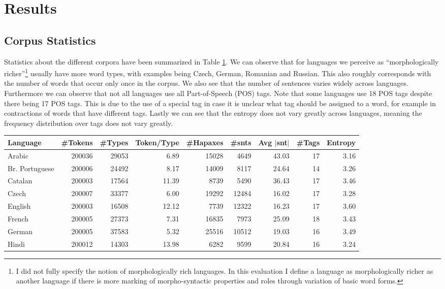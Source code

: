\documentclass[11pt]{article}
\begin{document}
{\section{Results}\label{res}
\subsection{Corpus Statistics}
Statistics about the different corpora have been summarized in Table \ref{stats}. We can observe that for languages we perceive as ``morphologically richer''\footnote{I did not fully specify the notion of morphologically rich languages. In this evaluation I define a language as morphologically richer as another language if there is more marking of morpho-syntactic properties and roles through variation of basic word forms.} usually have more word types, with examples being Czech, German, Romanian and Russian. This also roughly corresponds with the number of words that occur only once in the corpus. We also see that the number of sentences varies widely across languages. Furthermore we can observe that not all languages use all Part-of-Speech (POS) tags. Note that some languages use 18 POS tags despite there being 17 POS tags. This is due to the use of a special tag in case it is unclear what tag should be assigned to a word, for example in contractions of words that have different tags. Lastly we can see that the entropy does not vary greatly across languages, meaning the frequency distribution over tags does not vary greatly. 
\begin{table}\label{stats}
\scriptsize
\centering
\begin{tabular}{l|r|r|r|r|r|r|r|r}
\bf{Language}&\bf{\#Tokens}&\bf{\#Types}&\bf{Token/Type}&\bf  \#Hapaxes&\bf{\#snts}&\bf{Avg $|$snt$|$}&\bf{\#Tags}&\bf{Entropy}\\
\hline
Arabic&200036&29053&6.89&15028 &4649&43.03&17&3.16\\
Br. Portuguese&200006&24492&8.17&14009 &8117&24.64&14&3.26\\
Catalan&200003&17564&11.39& 8739 &5490&36.43&17&3.46\\
Czech&200007&33377&6.00& 19292 &12484&16.02&17&3.28\\
English&200003&16508&12.12& 7739 &12322&16.23&17&3.60\\
French&200005&27373&7.31&16835 &7973&25.09&18&3.43\\
German&200005&37583&5.32& 25516 &10512&19.03&16&3.49\\
Hindi&200012&14303&13.98&6282 &9599&20.84&16&3.24\\

\end{tabular}
\end{table}}
\end{document}
